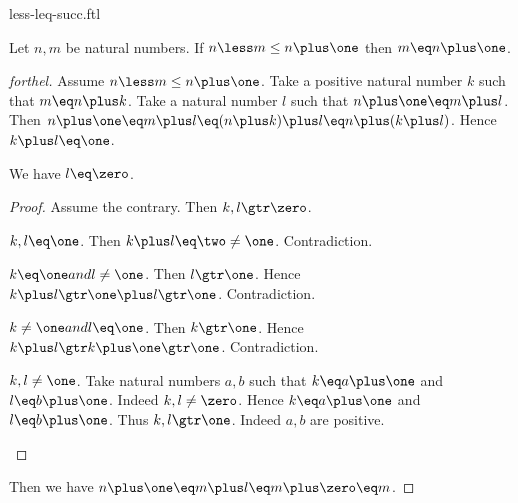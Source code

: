 \documentclass{stex}
\begin{document}
\begin{smodule}{less-leq-succ.ftl}


\begin{proposition}[forthel,id=LessLeqSuccProp]
  Let $n, m$ be natural numbers.
  If $n \less m \leq n \plus \one$ then $m \eq n \plus \one$.
\end{proposition}
\begin{proof}[forthel]
  Assume $n \less m \leq n \plus \one$.
  Take a positive natural number $k$ such that $m \eq n \plus k$.
  Take a natural number $l$ such that $n \plus \one \eq m \plus l$.
  Then $n \plus \one
    \eq m \plus l
    \eq (n \plus k) \plus l
    \eq n \plus (k \plus l)$.
  Hence $k \plus l \eq \one$.

  We have $l \eq \zero$.
  \begin{proof}
    Assume the contrary.
    Then $k,l \gtr \zero$.

    \begin{case}{$k,l \eq \one$.}
      Then $k \plus l
        \eq \two
        \neq \one$.
      Contradiction.
    \end{case}

    \begin{case}{$k \eq \one and l \neq \one$.}
      Then $l \gtr \one$.
      Hence $k \plus l
        \gtr \one \plus l
        \gtr \one$.
      Contradiction.
    \end{case}

    \begin{case}{$k \neq \one and l \eq \one$.}
      Then $k \gtr \one$.
      Hence $k \plus l
        \gtr k \plus \one
        \gtr \one$.
      Contradiction.
    \end{case}

    \begin{case}{$k, l \neq \one$.}
      Take natural numbers $a, b$ such that $k \eq a \plus \one$ and $l \eq b \plus \one$.
      Indeed $k, l \neq \zero$.
      Hence $k \eq a \plus \one$ and $l \eq b \plus \one$.
      Thus $k, l \gtr \one$.
      Indeed $a, b$ are positive.
    \end{case}
  \end{proof}

  Then we have $n \plus \one
    \eq m \plus l
    \eq m \plus \zero
    \eq m$.
\end{proof}

\end{smodule}
\end{document}
